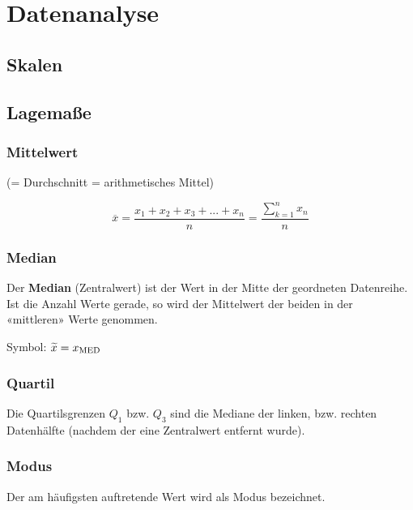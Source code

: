 
\newpage
\section*{Datenanalyse}

\subsection*{Skalen}
\vspace{5mm}


\hrulefill
\begin{multicols}{2}

\subsection*{Lagemaße}
\subsubsection*{Mittelwert}
(= Durchschnitt = arithmetisches Mittel)


$$\overline{x} = \frac{x_1 + x_2 + x_3 + ... + x_n}{n}=  \frac{\sum\limits_{k=1}^nx_n}n$$


\subsubsection*{Median}


Der \textbf{Median} (Zentralwert) ist der Wert in der Mitte der geordneten Datenreihe. Ist
die Anzahl Werte gerade, so wird der Mittelwert der beiden in der
«mittleren» Werte genommen.

Symbol: $\widetilde{x} = x_{\textrm{MED}}$


\subsubsection*{Quartil}

Die Quartilsgrenzen $Q_1$ bzw. $Q_3$ sind die Mediane der linken,
bzw. rechten Datenhälfte (nachdem der eine Zentralwert entfernt
wurde).

\subsubsection*{Modus}
Der am häufigsten auftretende Wert wird als Modus bezeichnet.


\end{multicols}
